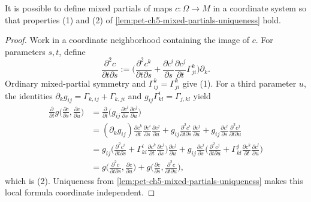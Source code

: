 \begin{theorem}
  \label{thm:pet-ch5-mixed-partials-existence}


  It is possible to define mixed partials of maps $c:\Omega\to M$ in a coordinate
  system so that properties (1) and (2) of \cref{lem:pet-ch5-mixed-partials-uniqueness}
  hold.
\end{theorem}
\begin{proof}

  \sketch
  Work in a coordinate neighborhood containing the image of $c$.  For parameters
  $s,t$, define
  \[
    \frac{\partial^2c}{\partial t\partial s}
    :=\Big(\frac{\partial^2c^k}{\partial t\partial s}+\frac{\partial c^i}{\partial s}\frac{\partial c^j}{\partial t}\Gamma^k_{ji}\Big)\partial_k.
  \]
  Ordinary mixed-partial symmetry and $\Gamma^k_{ij}=\Gamma^k_{ji}$ give (1).
  For a third parameter $u$, the identities
  $\partial_kg_{ij}=\Gamma_{k,ij}+\Gamma_{k,ji}$ and
  $g_{ij}\Gamma^i_{kl}=\Gamma_{j,kl}$ yield
  \begin{align*}
    \frac{\partial}{\partial t}g\Big(\frac{\partial c}{\partial s},\frac{\partial c}{\partial u}\Big)
    &=\frac{\partial}{\partial t}\Big(g_{ij}\frac{\partial c^i}{\partial s}\frac{\partial c^j}{\partial u}\Big)\\
    &=(\partial_kg_{ij})\frac{\partial c^k}{\partial t}\frac{\partial c^i}{\partial s}\frac{\partial c^j}{\partial u}
    +g_{ij}\frac{\partial^2c^i}{\partial t\partial s}\frac{\partial c^j}{\partial u}
    +g_{ij}\frac{\partial c^i}{\partial s}\frac{\partial^2c^j}{\partial t\partial u}\\
    &=g_{ij}\Big(\frac{\partial^2c^i}{\partial t\partial s}+\Gamma^i_{kl}\frac{\partial c^k}{\partial t}\frac{\partial c^l}{\partial s}\Big)\frac{\partial c^j}{\partial u}
    +g_{ij}\frac{\partial c^i}{\partial s}\Big(\frac{\partial^2c^j}{\partial t\partial u}+\Gamma^j_{kl}\frac{\partial c^k}{\partial t}\frac{\partial c^l}{\partial u}\Big)\\
    &=g\Big(\frac{\partial^2c}{\partial t\partial s},\frac{\partial c}{\partial u}\Big)
    +g\Big(\frac{\partial c}{\partial s},\frac{\partial^2c}{\partial t\partial u}\Big),
  \end{align*}
  which is (2).  Uniqueness from
  \cref{lem:pet-ch5-mixed-partials-uniqueness} makes this local formula
  coordinate independent.
\end{proof}

